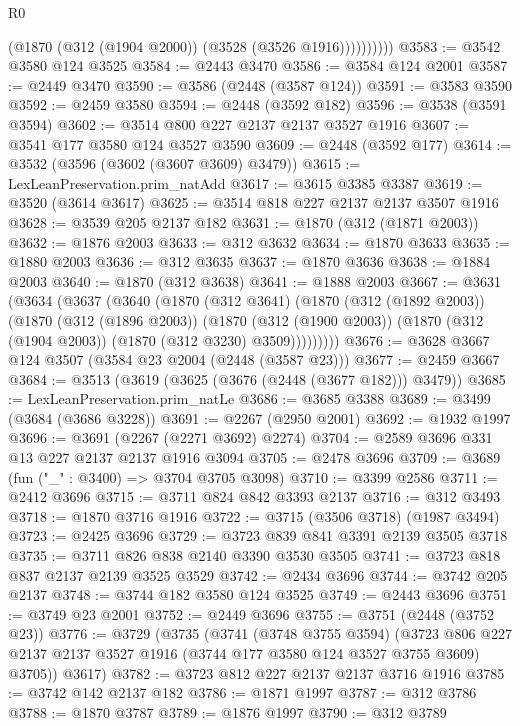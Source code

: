 \begin{lexlean}{R0}
\begin{coremodule}
                  (@1870 (@312 (@1904 @2000)) (@3528 (@3526 @1916))))))))))
@3583 := @3542 @3580 @124 @3525
@3584 := @2443 @3470
@3586 := @3584 @124 @2001
@3587 := @2449 @3470
@3590 := @3586 (@2448 (@3587 @124))
@3591 := @3583 @3590
@3592 := @2459 @3580
@3594 := @2448 (@3592 @182)
@3596 := @3538 (@3591 @3594)
@3602 := @3514 @800 @227 @2137 @2137 @3527 @1916
@3607 := @3541 @177 @3580 @124 @3527 @3590
@3609 := @2448 (@3592 @177)
@3614 := @3532 (@3596 (@3602 (@3607 @3609) @3479))
@3615 := LexLeanPreservation.prim_natAdd
@3617 := @3615 @3385 @3387
@3619 := @3520 (@3614 @3617)
@3625 := @3514 @818 @227 @2137 @2137 @3507 @1916
@3628 := @3539 @205 @2137 @182
@3631 := @1870 (@312 (@1871 @2003))
@3632 := @1876 @2003
@3633 := @312 @3632
@3634 := @1870 @3633
@3635 := @1880 @2003
@3636 := @312 @3635
@3637 := @1870 @3636
@3638 := @1884 @2003
@3640 := @1870 (@312 @3638)
@3641 := @1888 @2003
@3667 := @3631
    (@3634
      (@3637
        (@3640
          (@1870
            (@312 @3641)
            (@1870
              (@312 (@1892 @2003))
              (@1870
                (@312 (@1896 @2003))
                (@1870
                  (@312 (@1900 @2003))
                  (@1870 (@312 (@1904 @2003)) (@1870 (@312 @3230) @3509)))))))))
@3676 := @3628 @3667 @124 @3507 (@3584 @23 @2004 (@2448 (@3587 @23)))
@3677 := @2459 @3667
@3684 := @3513 (@3619 (@3625 (@3676 (@2448 (@3677 @182))) @3479))
@3685 := LexLeanPreservation.prim_natLe
@3686 := @3685 @3388
@3689 := @3499 (@3684 (@3686 @3228))
@3691 := @2267 (@2950 @2001)
@3692 := @1932 @1997
@3696 := @3691 (@2267 (@2271 @3692) @2274)
@3704 := @2589 @3696 @331 @13 @227 @2137 @2137 @1916 @3094
@3705 := @2478 @3696
@3709 := @3689 (fun ("_" : @3400) => @3704 @3705 @3098)
@3710 := @3399 @2586
@3711 := @2412 @3696
@3715 := @3711 @824 @842 @3393 @2137
@3716 := @312 @3493
@3718 := @1870 @3716 @1916
@3722 := @3715 (@3506 @3718) (@1987 @3494)
@3723 := @2425 @3696
@3729 := @3723 @839 @841 @3391 @2139 @3505 @3718
@3735 := @3711 @826 @838 @2140 @3390 @3530 @3505
@3741 := @3723 @818 @837 @2137 @2139 @3525 @3529
@3742 := @2434 @3696
@3744 := @3742 @205 @2137
@3748 := @3744 @182 @3580 @124 @3525
@3749 := @2443 @3696
@3751 := @3749 @23 @2001
@3752 := @2449 @3696
@3755 := @3751 (@2448 (@3752 @23))
@3776 := @3729
    (@3735
      (@3741
        (@3748 @3755 @3594)
        (@3723 @806 @227 @2137 @2137 @3527 @1916 (@3744 @177 @3580 @124 @3527 @3755 @3609) @3705))
      @3617)
@3782 := @3723 @812 @227 @2137 @2137 @3716 @1916
@3785 := @3742 @142 @2137 @182
@3786 := @1871 @1997
@3787 := @312 @3786
@3788 := @1870 @3787
@3789 := @1876 @1997
@3790 := @312 @3789

\end{coremodule}
\end{lexlean}
